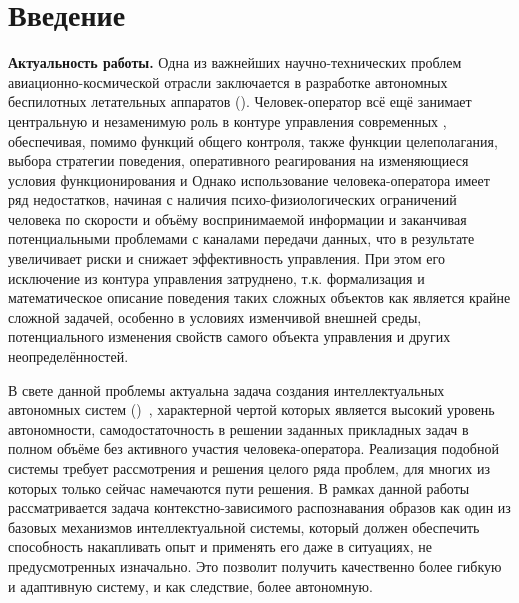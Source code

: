 \chapter*{Введение} \label{introduction}

\textbf{Актуальность работы.} Одна из важнейших научно-технических проблем авиационно-космической отрасли заключается в разработке автономных беспилотных летательных аппаратов (). Человек-оператор всё ещё занимает центральную и незаменимую роль в контуре управления современных , обеспечивая, помимо функций общего контроля, также функции целеполагания, выбора стратегии поведения, оперативного реагирования на изменяющиеся условия функционирования и \other Однако использование человека-оператора имеет ряд недостатков, начиная с наличия психо-физиологических ограничений человека по скорости и объёму воспринимаемой информации и заканчивая потенциальными проблемами с каналами передачи данных, что в результате увеличивает риски и снижает эффективность управления. При этом его исключение из контура управления затруднено, т.к. формализация и математическое описание поведения таких сложных объектов как  является крайне сложной задачей, особенно в условиях изменчивой внешней среды, потенциального изменения свойств самого объекта управления и других неопределённостей.

В свете данной проблемы актуальна задача создания \socalled интеллектуальных автономных систем ()~\cite{Tiumentsev2002-KII}, характерной чертой которых является высокий уровень автономности, \ie самодостаточность в решении заданных прикладных задач в полном объёме без активного участия человека-оператора. Реализация подобной системы требует рассмотрения и решения целого ряда проблем, для многих из которых только сейчас намечаются пути решения. В рамках данной работы рассматривается задача контекстно-зависимого распознавания образов как один из базовых механизмов интеллектуальной системы, который должен обеспечить способность накапливать опыт и применять его даже в ситуациях, не предусмотренных изначально. Это позволит получить качественно более гибкую и адаптивную систему, и как следствие, более автономную.

